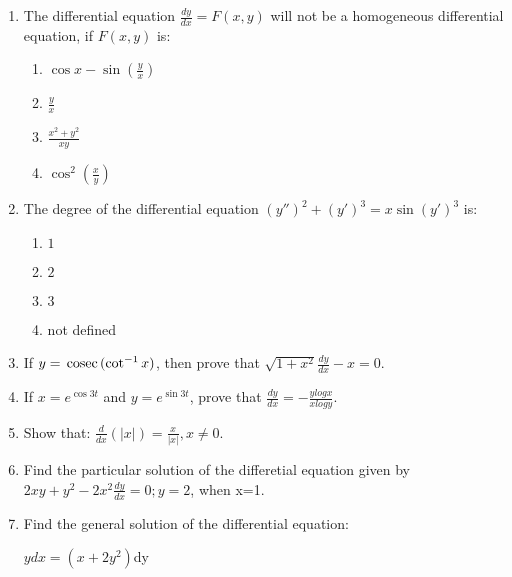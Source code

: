 \documentclass{article}
\begin{document}
\begin{enumerate}
	\item The differential equation $\frac{dy}{dx}=F(x,y)$ will not be a homogeneous differential equation, if $F(x,y)$ is:
		\begin{enumerate}
			\item $\cos x - \sin (\frac{y}{x})$
			\item $\frac{y}{x}$
			\item $\frac{x^{2} + y^{2}}{xy}$
			\item $\cos^{2}(\frac{x}{y})$
		\end{enumerate}
	\item The degree of the differential equation $(y'')^{2} + (y')^{3} = x\sin(y')^{3}$ is:
		\begin{enumerate}
			\item $1$
			\item $2$
			\item $3$
			\item not defined
		\end{enumerate}
	\item If $y=\,\text{cosec}\, (\cot^{-1} x)$, then prove that $\sqrt{1 + x^{2}} \frac{dy}{dx} -x = 0$.
	\item If $x=e^{\cos 3t}$ and $y=e^{\sin 3t}$, prove that $\frac{dy}{dx} = -\frac{ylogx}{xlogy}$.
	\item Show that: $\frac{d}{dx} (|x|)=\frac{x}{|x|}, x\neq0$.
	\item  Find the particular solution of the differetial equation given by $2xy + y^{2} - 2x^{2} \frac{dy}{dx} = 0; y=2$, when x=1.
	\item Find the general solution of the differential equation:\\
		\centerline {$ydx = (x + 2y^{2})$dy}
\end{enumerate}
\end{document}
